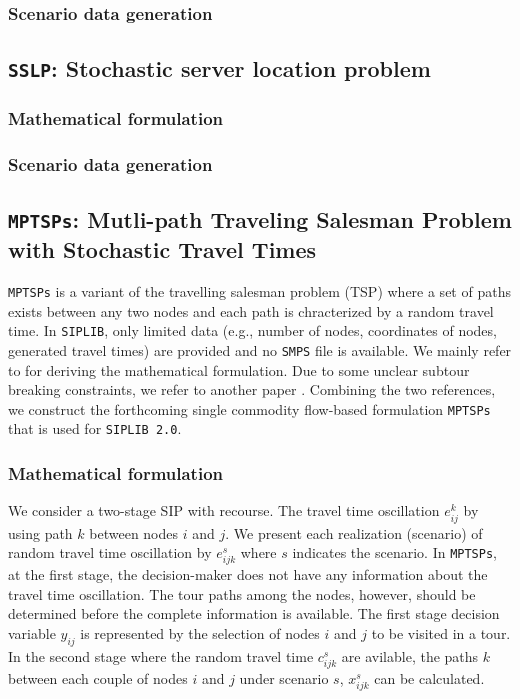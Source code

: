 \subsubsection{Scenario data generation}


\subsection{\texttt{SSLP}: Stochastic server location problem}

\subsubsection{Mathematical formulation}

\subsubsection{Scenario data generation}


\subsection{\texttt{MPTSPs}: Mutli-path Traveling Salesman Problem with Stochastic Travel Times}
\texttt{MPTSPs} is a variant of the travelling salesman problem (TSP) where a set of paths exists between any two nodes and each path is chracterized by a random travel time. In \texttt{SIPLIB}, only limited data (e.g., number of nodes, coordinates of nodes, generated travel times) are provided and no \texttt{SMPS} file is available. We mainly refer to \cite{journal:PGM2017} for deriving the mathematical formulation. Due to some unclear subtour breaking constraints, we refer to another paper \cite{journal:LSD1990}. Combining the two references, we construct the forthcoming single commodity flow-based formulation \texttt{MPTSPs} that is used for \texttt{SIPLIB 2.0}. 
\subsubsection{Mathematical formulation}
We consider a two-stage SIP with recourse. The travel time oscillation $e_{ij}^k$ by using path $k$ between nodes $i$ and $j$. We present each realization (scenario) of random travel time oscillation by $e_{ijk}^{s}$ where $s$ indicates the scenario. In \texttt{MPTSPs}, at the first stage, the decision-maker does not have any information about the travel time oscillation. The tour paths among the nodes, however, should be determined before the complete information is available. The first stage decision variable $y_{ij}$ is represented by the selection of nodes $i$ and $j$ to be visited in a tour. In the second stage where the random travel time $c_{ijk}^{s}$ are avilable, the paths $k$ between each couple of nodes $i$ and $j$ under scenario $s$, $x_{ijk}^{s}$ can be calculated. 

